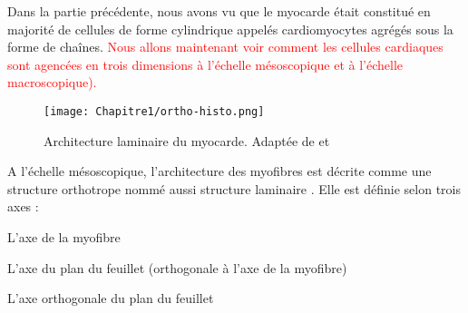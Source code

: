 Dans la partie précédente, nous avons vu que le myocarde était constitué en majorité de cellules de forme cylindrique 
appelés cardiomyocytes agrégés sous la forme de chaînes.
 \textcolor{red}{Nous allons maintenant voir comment les cellules cardiaques sont agencées en trois dimensions
  à l’échelle mésoscopique et à l'échelle macroscopique).}\\

  \begin{figure}[!h]
    \begin{center}
      \texttt{[image: Chapitre1/ortho-histo.png]}
    \end{center}
    \caption{Architecture laminaire du myocarde. Adaptée de \cite{Rohmer2007} et \cite{Khalique_2020}}
    \label{fig:model_fibre}
  \end{figure}


A l’échelle mésoscopique, l’architecture des myofibres est décrite comme une structure orthotrope nommé aussi
 structure laminaire \cite{NiellesVallespin2019}. Elle est définie selon trois axes : 

\begin{bulletList}
 \item L’axe de la myofibre
 \item L’axe du plan du feuillet (orthogonale à l’axe de la myofibre)
 \item L’axe orthogonale du plan du feuillet
\end{bulletList}


